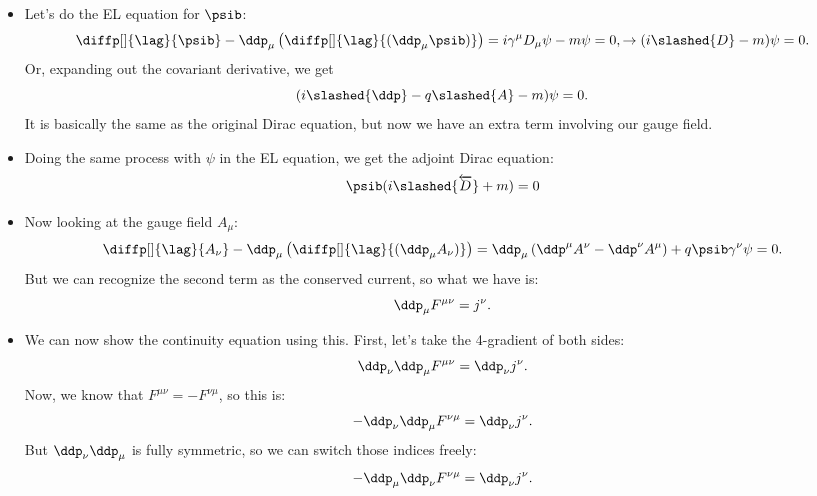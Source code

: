 \begin{itemize}
    \item Let's do the EL equation for $\psib$:
        \begin{gather*}
            \diffp[]{\lag}{\psib} - \ddp_{\mu}\left( \diffp[]{\lag}{(\ddp_{\mu}\psib)} \right) = i\gamma^{\mu}D_{\mu}\psi - m\psi = 0, 
            \rightarrow (i\slashed{D} - m)\psi = 0.
        \end{gather*}
        Or, expanding out the covariant derivative, we get
        \begin{equation*}
            (i\slashed{\ddp} - q\slashed{A} - m)\psi = 0.
        \end{equation*}
        It is basically the same as the original Dirac equation, but now we have an extra term involving our gauge field.
    \item Doing the same process with $\psi$ in the EL equation, we get the adjoint Dirac equation:
        \begin{equation*}
            \psib(i\slashed{\overleftarrow{D}} + m) = 0
        \end{equation*}
    \item Now looking at the gauge field $A_{\mu}$:
        \begin{equation*}
            \diffp[]{\lag}{A_{\nu}} - \ddp_{\mu}\left( \diffp[]{\lag}{(\ddp_{\mu}A_{\nu})} \right) = \ddp_{\mu}\left( \ddp^{\mu}A^{\nu} - \ddp^{\nu}A^{\mu} \right) + q\psib\gamma^{\nu}\psi = 0.
        \end{equation*}
        But we can recognize the second term as the conserved current, so what we have is:
        \begin{equation}
            \ddp_{\mu}F^{\mu\nu} = j^{\nu}.
        \end{equation}
    \item We can now show the continuity equation using this. First, let's take the 4-gradient of both sides:
        \begin{equation*}
            \ddp_{\nu}\ddp_{\mu}F^{\mu\nu} = \ddp_{\nu}j^{\nu}.
        \end{equation*}
        Now, we know that $F^{\mu\nu} = -F^{\nu\mu}$, so this is:
        \begin{equation*}
            -\ddp_{\nu}\ddp_{\mu}F^{\nu\mu} = \ddp_{\nu}j^{\nu}.
        \end{equation*}
        But $\ddp_{\nu}\ddp_{\mu}$ is fully symmetric, so we can switch those indices freely:
        \begin{equation*}
            -\ddp_{\mu}\ddp_{\nu}F^{\nu\mu} = \ddp_{\nu}j^{\nu}.

\end{equation*}
\end{itemize}
